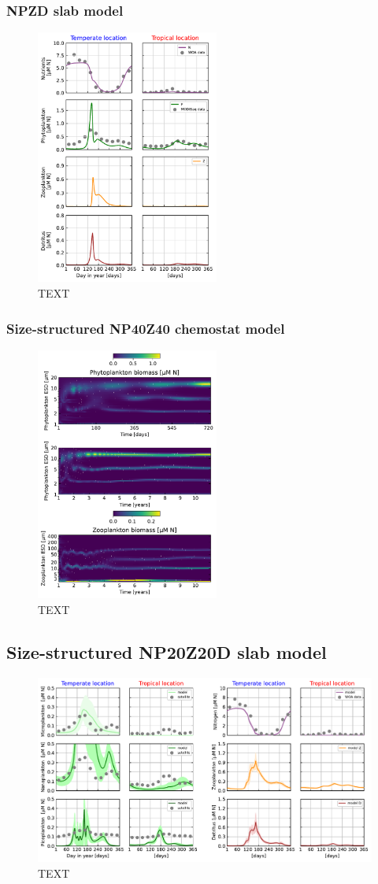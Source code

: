 \documentclass[journal abbreviation, manuscript]{copernicus}
\begin{document}
\subsubsection{NPZD slab model}

\begin{figure}[t]
\includegraphics[width=6cm]{Figures/firstdraft_plots/02_NPZDslab.pdf}
\caption{TEXT}
\end{figure}

\subsubsection{Size-structured NP40Z40 chemostat model}
\begin{figure}[t]
\includegraphics[width=6cm]{Figures/firstdraft_plots/03_chemostat.pdf}
\caption{TEXT}
\label{ASTroCAT_plot}
\end{figure}

\subsection{Size-structured NP20Z20D slab model}
\begin{figure}[t]
\includegraphics[width=12cm]{Figures/firstdraft_plots/04_sizestruct_slab.pdf}
\caption{TEXT}
\label{ASTroCAT_plot}
\end{figure}
\end{document}
